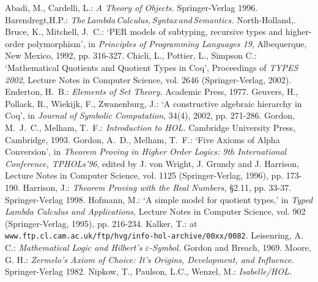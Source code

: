\documentclass[envcountsame,runningheads]{llncs}
\begin{document}
%
%
\begin{thebibliography}{5}
%
Abadi, M., Cardelli, L.:
{\it A Theory of Objects.}
Springer-Verlag 1996.
%
Barendregt,\:H.P.:
{\it The\,Lambda\,Calculus,\,Syntax\,and\,Semantics.}
North-Holland,.
%
Bruce, K., Mitchell, J.~C.:
`PER models of subtyping, recursive types and higher-order polymorphism', in
{\it Principles of Programming Languages 19},
Albequerque, New Mexico, 1992, pp. 316-327.
%
Chicli, L., Pottier, L., Simpson C.:
`Mathematical Quotients and Quotient Types in Coq',
Proceedings of {\it TYPES 2002},
Lecture Notes in Computer Science, vol. 2646
(Springer-Verlag, 2002).
%
Enderton, H.~B.:
{\it Elements of Set Theory.}
Academic Press, 1977.
%
Geuvers, H., Pollack, R., Wiekijk, F., Zwanenburg, J.:
`A constructive algebraic hierarchy in Coq', in
{\it Journal of Symbolic Computation}, 34(4), 2002, pp. 271-286.
%
Gordon, M.~J.~C., Melham, T.~F.:
{\it Introduction to HOL.}
Cambridge University Press, Cambridge, 1993.
%
Gordon, A.~D., Melham, T.~F.:
`Five Axioms of Alpha Conversion', in
{\it Theorem Proving in Higher Order Logics:
9th International Conference, TPHOLs'96},
edited by J. von Wright, J. Grundy and J. Harrison,
Lecture Notes in Computer Science, vol. 1125
(Springer-Verlag, 1996), pp. 173-190.
%
Harrison, J.:
{\it Theorem Proving with the Real Numbers,}
\S{2.11}, pp. 33-37.
Springer-Verlag 1998.
%
Hofmann, M.:
`A simple model for quotient types,' in
{\it Typed Lambda Calculus and Applications}, 
Lecture Notes in Computer Science, vol. 902
(Springer-Verlag, 1995), pp. 216-234.
%
%
%
Kalker, T.: at
{\tt www.ftp.cl.cam.ac.uk/ftp/hvg/info-hol-archive/00xx/0082}.
%
Leisenring, A. C.:
{\it Mathematical Logic and Hilbert's $\varepsilon$-Symbol.}
Gordon and Breach, 1969.
%
Moore, G. H.:
{\it Zermelo's Axiom of Choice: It's Origins, Development, and Influence.}
Springer-Verlag 1982.
%
Nipkow, T., Paulson, L.C., Wenzel, M.:
{\it Isabelle/HOL.}

\end{thebibliography}
\end{document}
